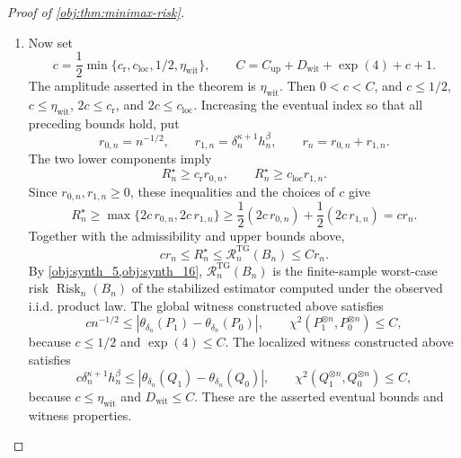 \documentclass[11pt]{article}
\begin{document}
\begin{proof}[Proof of \cref{obj:thm:minimax-risk}]
\begin{enumerate}
\item Now set
\[
c=
\frac12\min\{c_{\mathrm r},c_{\mathrm{loc}},1/2,\eta_{\mathrm{wit}}\},
\qquad
C=C_{\mathrm{up}}+D_{\mathrm{wit}}+\exp(4)+c+1 .
\]
The amplitude asserted in the theorem is \(\eta_{\mathrm{wit}}\).  Then \(0<c<C\), and \(c\le1/2\), \(c\le \eta_{\mathrm{wit}}\), \(2c\le c_{\mathrm r}\), and
\(2c\le c_{\mathrm{loc}}\).  Increasing the eventual index so that all preceding
bounds hold, put
\[
r_{0,n}=n^{-1/2},
\qquad
r_{1,n}=\delta_n^{\kappa+1}h_n^\beta,
\qquad
r_n=r_{0,n}+r_{1,n}.
\]
The two lower components imply
\[
R_n^\star\ge c_{\mathrm r}r_{0,n},
\qquad
R_n^\star\ge c_{\mathrm{loc}}r_{1,n}.
\]
Since \(r_{0,n},r_{1,n}\ge0\), these inequalities and the choices of \(c\) give
\[
R_n^\star
\ge
\max\{2c\,r_{0,n},2c\,r_{1,n}\}
\ge
\frac12(2c\,r_{0,n})+
\frac12(2c\,r_{1,n})
=
c r_n .
\]
Together with the admissibility and upper bounds above,
\[
c r_n
\le
R_n^\star
\le
\mathcal R_n^{\mathrm{TG}}(B_n)
\le
C r_n .
\]
By \cref{obj:synth_5,obj:synth_16}, \(\mathcal R_n^{\mathrm{TG}}(B_n)\) is the
finite-sample worst-case risk \(\operatorname{Risk}_n(B_n)\) of the stabilized estimator
computed under the observed i.i.d. product law.  The global witness constructed above satisfies
\[
c n^{-1/2}
\le
\left|\theta_{\delta_n}(P_1)-\theta_{\delta_n}(P_0)\right|,
\qquad
\chi^2(P_1^{\otimes n},P_0^{\otimes n})\le C,
\]
because \(c\le1/2\) and \(\exp(4)\le C\).  The localized witness constructed above
satisfies
\[
c\delta_n^{\kappa+1}h_n^\beta
\le
\left|\theta_{\delta_n}(Q_1)-\theta_{\delta_n}(Q_0)\right|,
\qquad
\chi^2(Q_1^{\otimes n},Q_0^{\otimes n})\le C,
\]
because \(c\le \eta_{\mathrm{wit}}\) and \(D_{\mathrm{wit}}\le C\).  These are the asserted eventual
bounds and witness properties.
\end{enumerate}
\end{proof}
\end{document}
